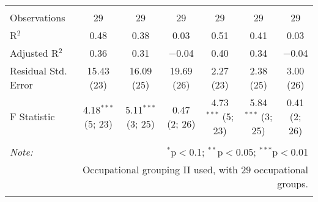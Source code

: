 \begin{sidewaystable}[!htbp]
\begin{tabular}{@{\extracolsep{0pt}}lcccccc}
  & & & & & & \\ 
\hline \\[-1.8ex] 
Observations & 29 & 29 & 29 & 29 & 29 & 29 \\ 
R$^{2}$ & 0.48 & 0.38 & 0.03 & 0.51 & 0.41 & 0.03 \\ 
Adjusted R$^{2}$ & 0.36 & 0.31 & $-$0.04 & 0.40 & 0.34 & $-$0.04 \\ 
Residual Std. Error & 15.43 (23) & 16.09 (25) & 19.69 (26) & 2.27 (23) & 2.38 (25) & 3.00 (26) \\ 
F Statistic & 4.18$^{***}$ (5; 23) & 5.11$^{***}$ (3; 25) & 0.47 (2; 26) & 4.73$^{***}$ (5; 23) & 5.84$^{***}$ (3; 25) & 0.41 (2; 26) \\ 
\hline 
\hline \\[-1.8ex] 
\textit{Note:}  & \multicolumn{6}{r}{$^{*}$p$<$0.1; $^{**}$p$<$0.05; $^{***}$p$<$0.01} \\ 
 & \multicolumn{6}{r}{Occupational grouping II used, with 29 occupational groups.} \\ 
\normalsize 
\end{tabular} 
\end{sidewaystable} 

